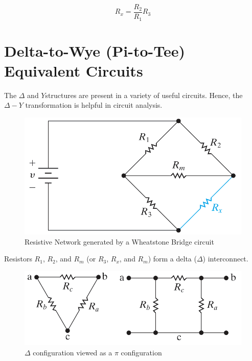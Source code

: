 \documentclass[14pt]{memoir}
\begin{document}
\begin{equation}
R_x = \frac{R_2}{R_1}R_3
\end{equation}

\section{Delta-to-Wye (Pi-to-Tee) Equivalent Circuits}

The $\Delta$ and $Y$structures are present in a variety of useful circuits. Hence, the $\Delta-Y$  transformation is helpful in circuit analysis. 

\begin{figure}[H]
\begin{center}
\includegraphics[scale=0.50]{fig/fig03_31.png}
\caption{Resistive Network generated by a Wheatstone Bridge circuit}
\label{fig:fig03_31}
\end{center}
\end{figure}

Resistors $R_1$, $R_2$, and $R_m$ (or $R_3$, $R_x$, and $R_m$) form a delta ($\Delta$) interconnect. 

\begin{figure}[H]
\begin{center}
\includegraphics[scale=0.50]{fig/fig03_32.png}
\caption{$\Delta$ configuration viewed as a $\pi$ configuration}
\label{fig:fig03_32}
\end{center}
\end{figure}
\end{document}
